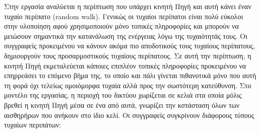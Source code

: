 Στην εργασία \cite{marios_randomwalks_1} αναλύεται η περίπτωση που υπάρχει κινητή Πηγή και αυτή κάνει έναν τυχαίο περίπατο (random walk). Γενικώς οι τυχαίοι
περίπατοι είναι πολύ εύκολοι στην υλοποίηση αφού χρησιμοποιούν μόνο τοπικές πληροφορίες και μπορούν να μειώσουν σημαντικά την κατανάλωση της ενέργειας λόγω της
τυχαιότητάς τους. Οι συγγραφείς προκειμένου να κάνουν ακόμα πιο αποδοτικούς τους τυχαίους περίπατους, δημιουργούν τους προσαρμοστικούς τυχαίους περίπατους. Σε αυτή
την περίπτωση, η κινητή Πηγή εκμεταλεύεται κάποιες επιπλέον τοπικές πληροφορίες προκειμένου να επηρρεάσει το επόμενο βήμα της, το οποίο και πάλι γίνεται πιθανοτικά
μόνο που αυτή τη φορά όχι τελείως ομοιόμορφα τυχαία αλλά προς την σωστότερη κατεύθυνση. Στο μοντέλο της εργασίας, η περιοχή του δικτύου χωρίζεται σε κελιά στα οποία
μόλις βρεθεί η κινητή Πηγή μέσα σε ένα από αυτά, γνωρίζει την κστάσταση όλων των αισθηρήρων που ανήκουν στο ίδιο κελί. Οι συγγραφείς συγκρίνουν διάφορους τύπους
τυχαίων περιπάτων:
